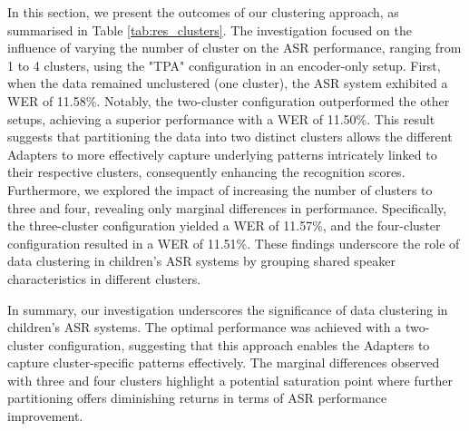 In this section, we present the outcomes of our clustering approach, as summarised in Table \ref{tab:res_clusters}. The investigation focused on the influence of varying the number of cluster on the ASR performance, ranging from 1 to 4 clusters, using the "TPA" configuration in an encoder-only setup. First, when the data remained unclustered (one cluster), the ASR system exhibited a 
WER of 11.58\%. Notably, the two-cluster configuration outperformed the other setups, achieving a superior performance with a WER of 11.50\%. This result suggests that partitioning the data into two distinct clusters allows the different Adapters to more effectively capture underlying patterns intricately linked to their respective clusters, consequently enhancing the recognition scores.
Furthermore, we explored the impact of increasing the number of clusters to three and four, revealing only marginal differences in performance. Specifically, the three-cluster configuration yielded a WER of 11.57\%, and the four-cluster configuration resulted in a WER of 11.51\%. These findings underscore the role of data clustering in children's ASR systems by grouping shared speaker characteristics in different clusters.

In summary, our investigation underscores the significance of data clustering in children's ASR systems. The optimal performance was achieved with a two-cluster configuration, suggesting that this approach enables the Adapters to capture cluster-specific patterns effectively. The marginal differences observed with three and four clusters highlight a potential saturation point where further partitioning offers diminishing returns in terms of ASR performance improvement.






